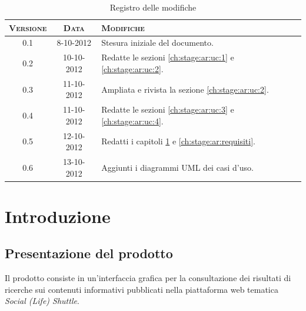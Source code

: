 \documentclass[10pt,a4paper,headinclude,footinclude,hidelinks]{scrreprt} %
\begin{document}
    \title{\rmfamily\normalfont{}}
    \author{}
    \date{\today}
    
    \maketitle
    
    \begin{abstract}
        \noindent Il documento illustra i casi d'uso e i requisiti dell'interfaccia grafica per la visualizzazione e la navigazione dei contenuti.
    \end{abstract}
    
	\begin{table}[ht]
	\centering
	\begin{tabular}{|c|c|l|}
	\hline
	\textsc{Versione} & \textsc{Data} & \textsc{Modifiche} \\ \hline
	0.1 & 8-10-2012 & Stesura iniziale del documento. \\ \hline
	0.2 & 10-10-2012 & Redatte le sezioni \ref{ch:stage:ar:uc:1} e \ref{ch:stage:ar:uc:2}. \\ \hline
	0.3 & 11-10-2012 & Ampliata e rivista la sezione \ref{ch:stage:ar:uc:2}. \\ \hline
	0.4 & 11-10-2012 & Redatte le sezioni \ref{ch:stage:ar:uc:3} e \ref{ch:stage:ar:uc:4}. \\ \hline
	0.5 & 12-10-2012 & Redatti i capitoli \ref{ch:stage:ar:intro} e \ref{ch:stage:ar:requisiti}. \\ \hline
	0.6 & 13-10-2012 & Aggiunti i diagrammi UML dei casi d'uso. \\ \hline
	\end{tabular}
	\caption{Registro delle modifiche}
	\label{tab:stage:wp:workload}
	\end{table}

	\tableofcontents

	\listoffigures

	\chapter{Introduzione}
	\label{ch:stage:ar:intro}

	\section{Presentazione del prodotto}
	\label{sec:stage:ar:intro:presentazione}
	Il prodotto consiste in un'interfaccia grafica per la consultazione dei risultati di ricerche sui contenuti informativi pubblicati nella piattaforma web tematica \textit{Social (Life) Shuttle}.
\end{document}

